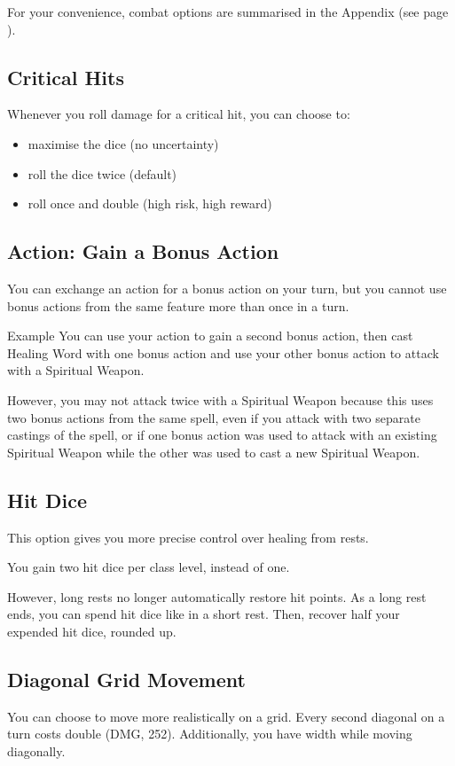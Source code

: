 \documentclass[letterpaper,twocolumn,openany,nodeprecatedcode,bg=print]{dndbook}
\newcommand{\pg}[1]{page \pageref{#1}}
\newcommand{\see}[1]{(see \pg{#1})}
\begin{document}
For your convenience, combat options are summarised in the Appendix \see{combat-options}.

\subsection{Critical Hits}
\label{critical-hit}
Whenever you roll damage for a critical hit, you can choose to:
\begin{itemize}
\item maximise the dice (no uncertainty)
\item roll the dice twice (default)
\item roll once and double (high risk, high reward)
\end{itemize}

\subsection{Action: Gain a Bonus Action}
\label{gameplay-bonus-action}
You can exchange an action for a bonus action on your turn, 
but you cannot use bonus actions from the same feature more than once in a turn.

\begin{DndComment}{Example}
You can use your action to gain a second bonus action, 
then cast Healing Word with one bonus action 
and use your other bonus action to attack with a Spiritual Weapon. 

However, you may not attack twice with a Spiritual Weapon because this uses two bonus actions from the same spell, 
even if you attack with two separate castings of the spell, 
or if one bonus action was used to attack with an existing Spiritual Weapon while the other was used to cast a new Spiritual Weapon.
\end{DndComment}

\subsection{Hit Dice}
This option gives you more precise control over healing from rests.

You gain two hit dice per class level, instead of one.

However, long rests no longer automatically restore hit points. 
As a long rest ends, you can spend hit dice like in a short rest. 
Then, recover half your expended hit dice, rounded up.

\subsection{Diagonal Grid Movement}
You can choose to move more realistically on a grid. 
Every second diagonal on a turn costs double (DMG, 252). 
Additionally, you have width while moving diagonally. 
\end{document}
